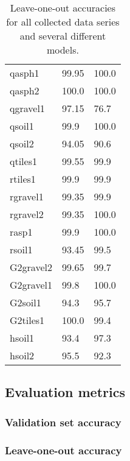 \begin{table}
\begin{center}
\begin{tabular}{|l|l|l|}
qasph1& 99.95 & \cellcolor{green!20}100.0\\
qasph2& \cellcolor{green!20}100.0 & \cellcolor{green!20}100.0\\
qgravel1& 97.15 & \cellcolor{red!20} 76.7\\
qsoil1 &99.9 & \cellcolor{green!20}100.0\\
qsoil2& 94.05 & \cellcolor{red!20} 90.6\\
qtiles1& 99.55 & 99.9\\
rtiles1 &99.9 & 99.9\\
rgravel1& 99.35 & 99.9\\
rgravel2 &99.35 & \cellcolor{green!20}100.0\\
rasp1 &99.9 & 100.0\\
rsoil1 &\cellcolor{red!20} 93.45 & 99.5\\
G2gravel2& 99.65& 99.7\\ 
G2gravel1& 99.8 & \cellcolor{green!20}100.0\\
G2soil1 &\cellcolor{red!20} 94.3 & 95.7\\
G2tiles1& \cellcolor{green!20}100.0 & 99.4\\
hsoil1 &\cellcolor{red!20} 93.4 &97.3\\
hsoil2 &95.5 & \cellcolor{red!20} 92.3 \\
\hline
  \end{tabular}
\end{center}
\caption{Leave-one-out accuracies for all collected data series and several different models.}
\end{table}

\subsection{Evaluation metrics}

\subsubsection{Validation set accuracy}

\subsubsection{Leave-one-out accuracy}

